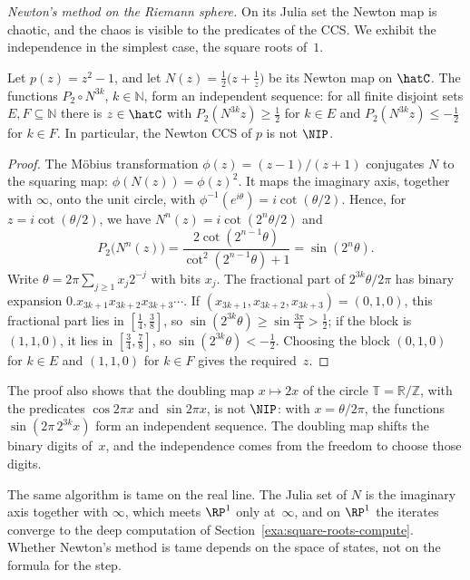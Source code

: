 \emph{Newton's method on the Riemann sphere.}
On its Julia set the Newton map is chaotic, and the chaos is visible to the
predicates of the CCS.
We exhibit the independence in the simplest case, the square roots of~$1$.

\begin{prop}\label{prop:Newton-wild}
Let $p(z)=z^2-1$, and let $N(z)=\frac12\bigl(z+\frac1z\bigr)$ be its Newton map on
$\hatC$.
The functions $P_2\circ N^{3k}$, $k\in\mathbb{N}$, form an independent sequence:
for all finite disjoint sets $E,F\subseteq\mathbb{N}$ there is $z\in\hatC$ with
$P_2(N^{3k}z)\ge\frac12$ for $k\in E$ and $P_2(N^{3k}z)\le-\frac12$ for $k\in F$.
In particular, the Newton CCS of $p$ is not $\NIP$.
\end{prop}

\begin{proof}
The Möbius transformation $\phi(z)=(z-1)/(z+1)$ conjugates $N$ to the squaring
map: $\phi(N(z))=\phi(z)^2$.
It maps the imaginary axis, together with $\infty$, onto the unit circle, with
$\phi^{-1}(e^{i\theta})=i\cot(\theta/2)$.
Hence, for $z=i\cot(\theta/2)$, we have $N^n(z)=i\cot(2^{n}\theta/2)$ and
\[
P_2\bigl(N^n(z)\bigr)=\frac{2\cot(2^{n-1}\theta)}{\cot^2(2^{n-1}\theta)+1}=\sin(2^n\theta).
\]
Write $\theta=2\pi\sum_{j\ge1}x_j2^{-j}$ with bits $x_j$.
The fractional part of $2^{3k}\theta/2\pi$ has binary expansion
$0.x_{3k+1}x_{3k+2}x_{3k+3}\cdots$.
If $(x_{3k+1},x_{3k+2},x_{3k+3})=(0,1,0)$, this fractional part lies in
$[\frac14,\frac38]$, so $\sin(2^{3k}\theta)\ge\sin\frac{3\pi}{4}>\frac12$; if the block
is $(1,1,0)$, it lies in $[\frac34,\frac78]$, so $\sin(2^{3k}\theta)<-\frac12$.
Choosing the block $(0,1,0)$ for $k\in E$ and $(1,1,0)$ for $k\in F$ gives the
required~$z$.
\end{proof}

The proof also shows that the doubling map $x\mapsto2x$ of the circle
$\mathbb{T}=\mathbb{R}/\mathbb{Z}$, with the predicates $\cos2\pi x$ and
$\sin2\pi x$, is not $\NIP$: with $x=\theta/2\pi$, the functions
$\sin(2\pi\,2^{3k}x)$ form an independent sequence.
The doubling map shifts the binary digits of~$x$, and the independence comes
from the freedom to choose those digits.

The same algorithm is tame on the real line.
The Julia set of $N$ is the imaginary axis together with $\infty$, which meets
$\RP^1$ only at~$\infty$, and on $\RP^1$ the iterates converge to the deep
computation of Section~\ref{exa:square-roots-compute}.
Whether Newton's method is tame depends on the space of states, not on the
formula for the step.

